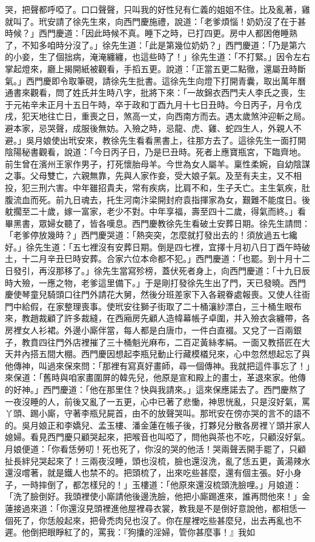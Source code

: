 哭，把聲都呼啞了。口口聲聲，只叫我的好性兒有仁義的姐姐不住。比及亂著，雞就叫了。玳安請了徐先生來，向西門慶施禮，說道：「老爹煩惱！奶奶沒了在于甚時候？」西門慶道：「因此時候不真。睡下之時，已打四更。房中人都困倦睡熟了，不知多咱時分沒了。」徐先生道：「此是第幾位奶奶？」西門慶道：「乃是第六的小妾，生了個拙病，淹淹纏纏，也這些時了！」徐先生道：「不打緊。」因令左右掌起燈來，廳上揭開紙被觀看，手搯五更。說道：「正當五更二點徹，還屬丑時斷氣。」西門慶即令取筆硯，請徐先生批書。這徐先生向燈下打開青囊，取出萬年曆通書來觀看，問了姓氏并生時八字，批將下來：「一故錦衣西門夫人李氏之喪，生于元祐辛未正月十五日午時，卒于政和丁酉九月十七日丑時。今日丙子，月令戊戌，犯天地往亡日，重喪之日，煞高一丈，向西南方而去。遇太歲煞沖迎斬之局。避本家，忌哭聲，成服後無妨。入殮之時，忌龍、虎、雞、蛇四生人，外親人不避。」吳月娘使出玳安來，教徐先生看看黑書上，往那方去了。這徐先生一面打開陰陽秘書觀看，說道：「今日丙子日，乃是巳丑時。死者上應寶瓶宮，下臨齊地。前生曾在濱州王家作男子，打死懷胎母羊。今世為女人屬羊。稟性柔婉，自幼陰謀之事。父母雙亡，六親無靠，先與人家作妾，受大娘子氣。及至有夫主，又不相投，犯三刑六害。中年雖招貴夫，常有疾病，比肩不和，生子夭亡。主生氣疾，肚腹流血而死。前九日魂去，托生河南汴梁開封府袁指揮家為女，艱難不能度日。後躭擱至二十歲，嫁一富家，老少不對。中年享福，壽至四十二歲，得氣而終。」看畢黑書，眾婦女聽了，皆各嘆息。西門慶教徐先生看破土安葬日期。徐先生請問：「老爹停放幾時？」西門慶哭道：「熱突突，怎麼就打發出去的！須放過五七纔好。」徐先生道：「五七裡沒有安葬日期。倒是四七裡，宜擇十月初八日丁酉午時破土，十二月辛丑巳時安葬。合家六位本命都不犯。」西門慶道：「也罷。到十月十二日發引，再沒那移了。」徐先生當寫殄榜，蓋伏死者身上，向西門慶道：「十九日辰時大殮，一應之物，老爹這里備下。」于是剛打發徐先生出了門，天已發曉。西門慶使琴童兒騎頭口往門外請花大舅，然後分班差家下入各親眷處報喪。又使人往衙門中給假，在家整理喪事。使玳安往獅子街取了二十桶瀼紗漂白，三十桶生眼布來，教趙裁顧了許多裁縫，在西廂房先顧人造幃幕帳子卓圍，并入殮衣衾纏帶，各房裡女人衫裙。外邊小廝伴當，每人都是白唐巾，一件白直裰。又兌了一百兩銀子，教賁四往門外店裡摧了三十桶魁光麻布，二百疋黃絲孝絹。一面又教搭匠在大天井內搭五間大棚。西門慶因想起李瓶兒動止行藏模檥兒來，心中忽然想起忘了與他傳神，叫過來保來問：「那裡有寫真好畫師，尋一個傳神。我就把這件事忘了！」來保道：「舊時與咱家畫圍屏的韓先兒，他原是宣和殿上的畫士，革退來家。他傳的好神。」西門慶道：「他在那里住？快與我請來。」這來保應諾去了。西門慶熬了一夜沒睡的人，前後又亂了一五更，心中已著了悲慟，神思恍亂，只是沒好氣，罵丫頭、踢小廝，守著李瓶兒屍首，由不的放聲哭叫。那玳安在傍亦哭的言不的語不的。吳月娘正和李嬌兒、孟玉樓、潘金蓮在帳子後，打夥兒分散各房裡丫頭并家人媳婦。看見西門慶只顧哭起來，把喉音也叫啞了，問他與茶也不吃，只顧沒好氣。月娘便道：「你看恁勞叨！死也死了，你沒的哭的他活！哭兩聲丟開手罷了，只顧扯長絆兒哭起來了！三兩夜沒睡，頭也沒梳，臉也還沒洗，亂了恁五更，黃湯辣水還沒嚐著，就是鐵人也禁不的。把頭梳了，出來吃些甚麼，還有個主張。好小身子，一時摔倒了，都怎樣兒的！」玉樓道：「他原來還沒梳頭洗臉哩。」月娘道：「洗了臉倒好。我頭裡使小廝請他後邊洗臉，他把小廝踢進來，誰再問他來！」金蓮接過來道：「你還沒見頭裡進他屋裡尋衣裳，教我是不是倒好意說他，都相恁一個死了，你恁般起來，把骨禿肉兒也沒了。你在屋裡吃些甚麼兒，出去再亂也不遲。他倒把眼睜紅了的，罵我：『狗攮的淫婦，管你甚麼事！』我如